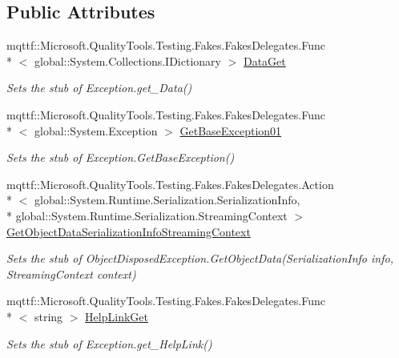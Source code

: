 \subsection*{Public Attributes}
\begin{DoxyCompactItemize}
\item 
mqttf\-::\-Microsoft.\-Quality\-Tools.\-Testing.\-Fakes.\-Fakes\-Delegates.\-Func\\*
$<$ global\-::\-System.\-Collections.\-I\-Dictionary $>$ \hyperlink{class_system_1_1_fakes_1_1_stub_object_disposed_exception_a48f5bf07d3289c869b523ca3630b6525}{Data\-Get}
\begin{DoxyCompactList}\small\item\em Sets the stub of Exception.\-get\-\_\-\-Data()\end{DoxyCompactList}\item 
mqttf\-::\-Microsoft.\-Quality\-Tools.\-Testing.\-Fakes.\-Fakes\-Delegates.\-Func\\*
$<$ global\-::\-System.\-Exception $>$ \hyperlink{class_system_1_1_fakes_1_1_stub_object_disposed_exception_aaa78b112d16864a7beaa3d7e19313e39}{Get\-Base\-Exception01}
\begin{DoxyCompactList}\small\item\em Sets the stub of Exception.\-Get\-Base\-Exception()\end{DoxyCompactList}\item 
mqttf\-::\-Microsoft.\-Quality\-Tools.\-Testing.\-Fakes.\-Fakes\-Delegates.\-Action\\*
$<$ global\-::\-System.\-Runtime.\-Serialization.\-Serialization\-Info, \\*
global\-::\-System.\-Runtime.\-Serialization.\-Streaming\-Context $>$ \hyperlink{class_system_1_1_fakes_1_1_stub_object_disposed_exception_a46144bfe697be1835b1e4a1adcb2c08d}{Get\-Object\-Data\-Serialization\-Info\-Streaming\-Context}
\begin{DoxyCompactList}\small\item\em Sets the stub of Object\-Disposed\-Exception.\-Get\-Object\-Data(\-Serialization\-Info info, Streaming\-Context context)\end{DoxyCompactList}\item 
mqttf\-::\-Microsoft.\-Quality\-Tools.\-Testing.\-Fakes.\-Fakes\-Delegates.\-Func\\*
$<$ string $>$ \hyperlink{class_system_1_1_fakes_1_1_stub_object_disposed_exception_a56a12a7542b71fba55d67c080780bf42}{Help\-Link\-Get}
\begin{DoxyCompactList}\small\item\em Sets the stub of Exception.\-get\-\_\-\-Help\-Link()\end{DoxyCompactList}\item 

\end{DoxyCompactItemize}
